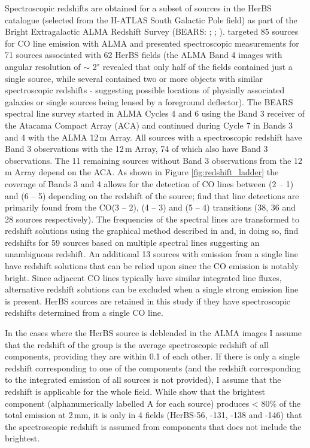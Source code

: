 Spectroscopic redshifts are obtained for a subset of sources in the HerBS catalogue (selected from the H-ATLAS South Galactic Pole field) as part of the Bright Extragalactic ALMA Redshift Survey (BEARS: \citealt{Urquhart_2022}; \citealt{Bendo_2023}; \citealt{Hagimoto_2023}). \citealt{Urquhart_2022} targeted 85 sources for CO line emission with ALMA and presented spectroscopic measurements for 71 sources associated with 62 HerBS fields (the ALMA Band 4 images with angular resolution of $\sim$ 2" revealed that only half of the fields contained just a single source, while several contained two or more objects with similar spectroscopic redshifts - suggesting possible locations of physially associated galaxies or single sources being lensed by a foreground deflector). The BEARS spectral line survey started in ALMA Cycles 4 and 6 using the Band 3 receiver of the Atacama Compact Array (ACA) and continued during Cycle 7 in Bands 3 and 4 with the ALMA 12\,m Array. All sources with a spectroscopic redshift have Band 3 observations with the 12\,m Array, 74 of which also have Band 3 observations. The 11 remaining sources without Band 3 observations from the 12\,m Array depend on the ACA. As shown in Figure \ref{fig:redshift_ladder}  the coverage of Bands 3 and 4 allows for the detection of CO lines between (2 -- 1) and (6 -- 5) depending on the redshift of the source; \citealt{Urquhart_2022} find that line detections are primarily found from the CO(3 -- 2), (4 -- 3) and (5 -- 4) transitions (38, 36 and 28 sources respectively). The frequencies of the spectral lines are transformed to redshift solutions using the graphical method described in \citealt{Bakx_2022} and, in doing so, find redshifts for 59 sources based on multiple spectral lines suggesting an unambiguous redshift. An additional 13 sources with emission from a single line have redshift solutions that can be relied upon since the CO emission is notably bright. Since adjacent CO lines typically have similar integrated line fluxes, alternative redshift solutions can be excluded when a single strong emission line is present. HerBS sources are retained in this study if they have spectroscopic redshifts determined from a single CO line.

In the cases where the HerBS source is deblended in the ALMA images I assume that the redshift of the group is the average spectroscopic redshift of all components, providing they are within 0.1 of each other. If there is only a single redshift corresponding to one of the components (and the redshift corresponding to the integrated emission of all sources is not provided), I assume that the redshift is applicable for the whole field. While \citealt{Bendo_2023} show that the brightest component (alphanumerically labelled A for each source) produces < 80\% of the total emission at 2\,mm, it is only in 4 fields (HerBS-56, -131, -138 and -146) that the spectroscopic redshift is assumed from components that does not include the brightest.

